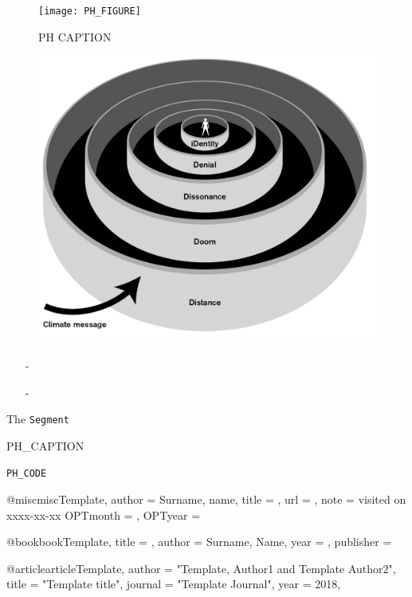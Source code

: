 \begin{figure}[H]
	\centering
	\texttt{[image: PH\_FIGURE]}
	\caption{PH CAPTION}
	\label{fig:PH_LABEL}
\end{figure}

\begin{figure}[H]
	\centering
	\includegraphics[width=0.9\linewidth]{figure/Analysis/5ds.png}
	\label{fig:5ds}
\end{figure}

\begin{itemize}\label{stuff}
	\item[-] 
\end{itemize}

\begin{enumerate}
	\item [-]
\end{enumerate}

The \texttt{Segment}

\begin{listing}[H]
	\caption{PH_CAPTION}
	\label{listing:PH_LABEL}
	\begin{verbatim}
PH_CODE
	\end{verbatim}
\end{listing}

@misc{miscTemplate,
	author = {Surname, name},
	title = {},
	url = {},
	note = {visited on xxxx-xx-xx}
	OPTmonth = {},
	OPTyear = {}
}

@book{bookTemplate,
	title = {},
	author = {Surname, Name},
	year = {},
	publisher = {}
}

@article{articleTemplate,
  author  = "Template, Author1 and Template Author2",
  title   = "Template title",
  journal = "Template Journal",
  year    = 2018,
}